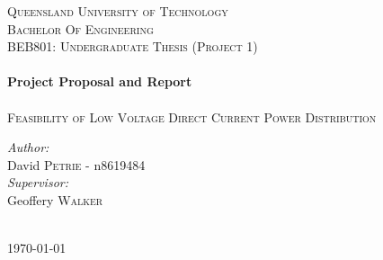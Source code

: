 \begin{titlepage}



\center %
 

\textsc{\LARGE Queensland University of Technology}\\[1.5cm] %
\textsc{\Large Bachelor Of Engineering}\\[0.5cm] %
\textsc{\large BEB801: Undergraduate Thesis (Project 1)}\\[0.5cm] %


\HRule \\[0.5cm]
{ \huge \bfseries Project Proposal and Report}\\[0.4cm] %
\HRule \\[2cm]
 
 

\textsc{\Large Feasibility of Low Voltage Direct Current Power Distribution}\\[4cm] 


\begin{minipage}{0.4\textwidth}
\begin{center} \large
\emph{Author:}\\
David \textsc{Petrie} - n8619484 \\[1cm]
\emph{Supervisor:}\\
Geoffery \textsc{Walker}\\
\end{center}
\end{minipage}
\\[1.5cm]


{\large \today}\\[2cm] %
 

\vfill %

\end{titlepage}